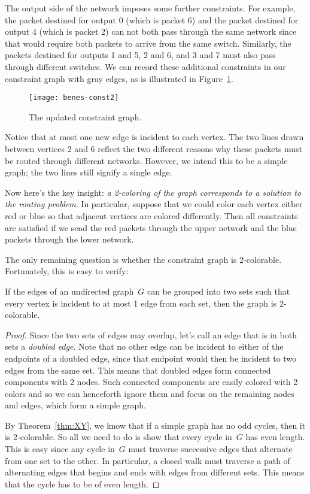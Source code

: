 The output side of the network imposes some further constraints.  For
example, the packet destined for output 0 (which is packet 6) and the
packet destined for output 4 (which is packet 2) can not both pass
through the same network since that would require both packets to
arrive from the same switch.  Similarly, the packets destined for
outputs 1 and 5, 2 and 6, and 3 and 7 must also pass through different
switches.  We can record these additional constraints in our
constraint graph with gray edges, as is illustrated in
Figure~\ref{fig:6EW}.

\begin{figure}

\texttt{[image: benes-const2]}

\caption{The updated constraint graph.}

\label{fig:6EW}

\end{figure}

Notice that at most one new edge is incident to each vertex.
The two lines drawn between vertices 2 and 6 reflect the two different
reasons why these packets must be routed through different networks.
However, we intend this to be a simple graph; the two lines still
signify a single edge.

Now here's the key insight: \emph{a 2-coloring of the graph
corresponds to a solution to the routing problem}.  In particular,
suppose that we could color each vertex either red or blue so that
adjacent vertices are colored differently.  Then all constraints are
satisfied if we send the red packets through the upper network and the
blue packets through the lower network.

The only remaining question is whether the constraint graph is
2-colorable.  Fortunately, this is easy to verify:

\begin{lemma}\label{deg1-union}
  If the edges of an undirected graph~$G$ can be grouped into two sets
  such that every vertex is incident to at most 1 edge from each set,
  then the graph is 2-colorable.
\end{lemma}

\begin{proof}
Since the two sets of edges may overlap, let's call an edge that is in
both sets a \emph{doubled edge}.  Note that no other edge can be
incident to either of the endpoints of a doubled edge, since that
endpoint would then be incident to two edges from the same set.  This
means that doubled edges form connected components with 2 nodes.  Such
connected components are easily colored with 2 colors and so we can
henceforth ignore them and focus on the remaining nodes and edges,
which form a simple graph.

By Theorem~\ref{thm:XY}, we know that if a simple graph has no odd
cycles, then it is 2-colorable.  So all we need to do is show that
every cycle in~$G$ has even length.  This is easy since any cycle
in~$G$ must traverse successive edges that alternate from one set to
the other.  In particular, a closed walk must traverse a path of
alternating edges that begins and ends with edges from different sets.
This means that the cycle has to be of even length.
\end{proof}

